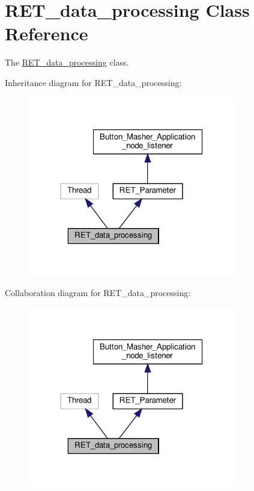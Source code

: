\hypertarget{classRET__data__processing_1_1RET__data__processing}{}\section{R\+E\+T\+\_\+data\+\_\+processing Class Reference}
\label{classRET__data__processing_1_1RET__data__processing}


The \hyperlink{classRET__data__processing_1_1RET__data__processing}{R\+E\+T\+\_\+data\+\_\+processing} class.  




Inheritance diagram for R\+E\+T\+\_\+data\+\_\+processing\+:
\nopagebreak
\begin{figure}[H]
\begin{center}
\leavevmode
\includegraphics[width=257pt]{classRET__data__processing_1_1RET__data__processing__inherit__graph}
\end{center}
\end{figure}


Collaboration diagram for R\+E\+T\+\_\+data\+\_\+processing\+:
\nopagebreak
\begin{figure}[H]
\begin{center}
\leavevmode
\includegraphics[width=257pt]{classRET__data__processing_1_1RET__data__processing__coll__graph}
\end{center}
\end{figure}
